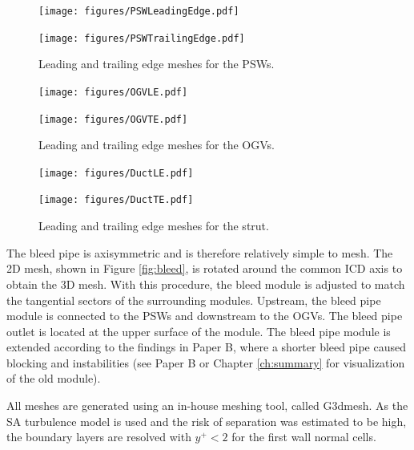 \begin{figure}[h!]
  \centering
  \begin{minipage}{0.49\columnwidth}
  \texttt{[image: figures/PSWLeadingEdge.pdf]}
  \end{minipage}
  \begin{minipage}{0.49\columnwidth}
  \texttt{[image: figures/PSWTrailingEdge.pdf]}
  \end{minipage}
  \caption{Leading and trailing edge meshes for the PSWs.} \label{fig:meshPSW}
\end{figure}
\begin{figure}[h!]
  \begin{minipage}{0.49\columnwidth}
  \texttt{[image: figures/OGVLE.pdf]}
  \end{minipage}
  \begin{minipage}{0.49\columnwidth}
  \texttt{[image: figures/OGVTE.pdf]}
  \end{minipage}
  \caption{Leading and trailing edge meshes for the OGVs.} \label{fig:meshOGV}
\end{figure}
\begin{figure}[h!]
  \begin{minipage}{0.49\columnwidth}
  \texttt{[image: figures/DuctLE.pdf]}
  \end{minipage}
  \begin{minipage}{0.49\columnwidth}
  \texttt{[image: figures/DuctTE.pdf]}
  \end{minipage}  
  \caption{Leading and trailing edge meshes for the strut.} \label{fig:meshDuct}
\end{figure}
The bleed pipe is axisymmetric and is therefore relatively simple to mesh. The 2D mesh, shown in Figure \ref{fig:bleed}, is rotated around the common ICD axis to obtain the 3D mesh. With this procedure, the bleed module is adjusted to match the tangential sectors of the surrounding modules. Upstream, the bleed pipe module is connected to the PSWs and downstream to the OGVs. The bleed pipe outlet is located at the upper surface of the module. The bleed pipe module is extended according to the findings in Paper B, where a shorter bleed pipe caused blocking and instabilities (see Paper B or Chapter \ref{ch:summary} for visualization of the old module). 

All meshes are generated using an in-house meshing tool, called G3dmesh. As the SA turbulence model is used and the risk of separation was estimated to be high, the boundary layers are resolved with $y^+<2$ for the first wall normal cells.

